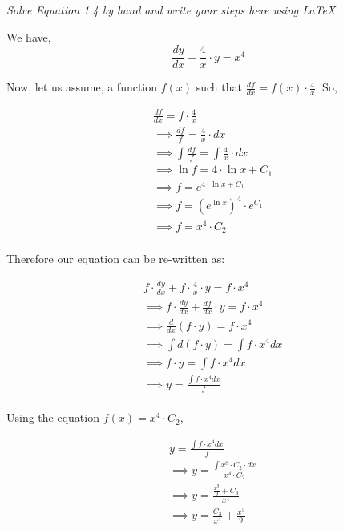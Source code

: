 \documentclass[11pt]{article}
\begin{document}
    \emph{Solve Equation 1.4 by hand and write your steps here using LaTeX}

We have, \[
\frac{dy}{dx} + \frac{4}{x} \cdot y = x^4
\]

Now, let us assume, a function \(f(x)\) such that $\frac{df}{dx} = f(x)
\cdot  \frac{4}{x} $. So,

\begin{align*}
        & \frac {df}{dx} =  f \cdot  \frac{4}{x}\\
        & \implies \frac {df}{f} =  \frac{4}{x} \cdot dx\\
        & \implies \int \frac {df}{f} =  \int \frac{4}{x} \cdot dx\\
        & \implies \ln{f} = 4 \cdot \ln{x} + C_1\\
        & \implies f = e^{4 \cdot \ln{x} + C_1}\\
        & \implies f = {(e^{\ln{x}})}^4 \cdot e^{C_1}\\
        & \implies f = x^4 \cdot C_2\\
\end{align*}

Therefore our equation can be re-written as:

\begin{align*}
        & f \cdot \frac{dy}{dx} + f \cdot \frac{4}{x} \cdot y =f \cdot x^4\\
        & \implies f \cdot \frac{dy}{dx} + \frac{df}{dx} \cdot y =f \cdot x^4\\
        & \implies \frac{d}{dx}(f \cdot y) = f \cdot x^4 \\
        & \implies \int {d}(f \cdot y) =  \int f \cdot x^4 {dx} \\
        & \implies f \cdot y =  \int f \cdot x^4 {dx} \\
        & \implies y =  \frac{\int f \cdot x^4 {dx}}{f} \\
\end{align*}

Using the equation \(f(x)= x^4 \cdot C_2\),

\begin{align*}
        & y =  \frac{\int f \cdot x^4 {dx}}{f} \\
        & \implies y = \frac{\int  x^8 \cdot C_2 \cdot {dx}}{ x^4 \cdot C_2} \\
        & \implies y = \frac{ \frac {x^9}{9} + C_3}{ x^4} \\
        & \implies y = \frac{C_3}{ x^4} + \frac {x^5}{9}  \\
\end{align*}
\end{document}
